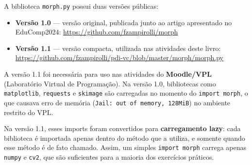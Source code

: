 \documentclass[
  portuguese,
  letterpaper,
  openany,
  oneside,
  12pt,
  a4paper]{book}
\begin{document}
\begin{tcolorbox}[enhanced jigsaw, colframe=quarto-callout-note-color-frame, opacitybacktitle=0.6, coltitle=black, rightrule=.15mm, bottomrule=.15mm, arc=.35mm, toprule=.15mm, breakable, opacityback=0, colbacktitle=quarto-callout-note-color!10!white, left=2mm, title=\textcolor{quarto-callout-note-color}{\faInfo}\hspace{0.5em}{Versões do \texttt{morph.py}}, bottomtitle=1mm, toptitle=1mm, titlerule=0mm, leftrule=.75mm, colback=white]

A biblioteca \texttt{morph.py} possui duas versões públicas:

\begin{itemize}
\item
  \textbf{Versão 1.0} --- versão original, publicada junto ao artigo
  apresentado no EduComp2024: \url{https://github.com/fzampirolli/morph}
\item
  \textbf{Versão 1.1} --- versão compacta, utilizada nas atividades
  deste livro:
  \url{https://github.com/fzampirolli/pdi-vc/blob/master/morph/morph.py}
\end{itemize}

A versão 1.1 foi necessária para uso nas atividades do
\textbf{Moodle/VPL} (Laboratório Virtual de Programação). Na versão 1.0,
bibliotecas como \texttt{matplotlib}, \texttt{requests} e
\texttt{skimage} são carregadas no momento do \texttt{import\ morph}, o
que causava erro de memória (\texttt{Jail:\ out\ of\ memory,\ 128MiB})
no ambiente restrito do VPL.

Na versão 1.1, esses imports foram convertidos para \textbf{carregamento
lazy}: cada biblioteca é importada apenas dentro do método que a
utiliza, e somente quando esse método é de fato chamado. Assim, um
simples \texttt{import\ morph} carrega apenas \texttt{numpy} e
\texttt{cv2}, que são suficientes para a maioria dos exercícios
práticos.

\end{tcolorbox}
\end{document}
